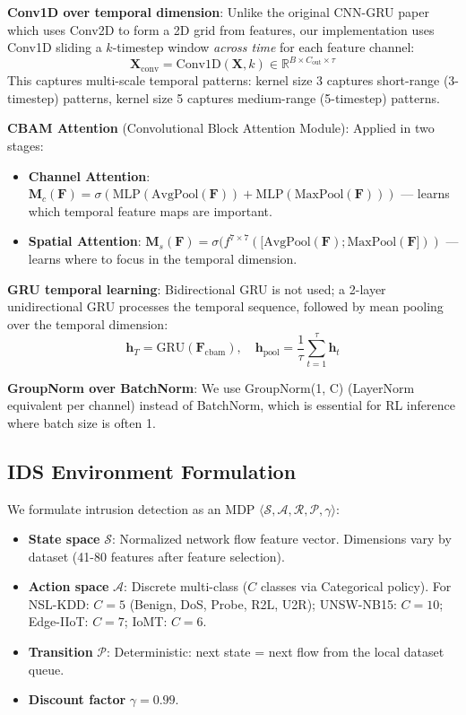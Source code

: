 \documentclass[conference]{IEEEtran}
\begin{document}
\textbf{Conv1D over temporal dimension}: Unlike the original CNN-GRU paper which uses Conv2D to form a 2D grid from features, our implementation uses Conv1D sliding a $k$-timestep window \emph{across time} for each feature channel:
\begin{equation}
\mathbf{X}_{\mathrm{conv}} = \mathrm{Conv1D}(\mathbf{X}, k) \in \mathbb{R}^{B \times C_{\mathrm{out}} \times \tau}
\end{equation}
This captures multi-scale temporal patterns: kernel size 3 captures short-range (3-timestep) patterns, kernel size 5 captures medium-range (5-timestep) patterns.

\textbf{CBAM Attention} (Convolutional Block Attention Module): Applied in two stages:
\begin{itemize}
    \item \textbf{Channel Attention}: $\mathbf{M}_c(\mathbf{F}) = \sigma(\mathrm{MLP}(\mathrm{AvgPool}(\mathbf{F})) + \mathrm{MLP}(\mathrm{MaxPool}(\mathbf{F})))$ --- learns which temporal feature maps are important.
    \item \textbf{Spatial Attention}: $\mathbf{M}_s(\mathbf{F}) = \sigma(f^{7\times7}([\mathrm{AvgPool}(\mathbf{F}); \mathrm{MaxPool}(\mathbf{F}]))$ --- learns where to focus in the temporal dimension.
\end{itemize}

\textbf{GRU temporal learning}: Bidirectional GRU is not used; a 2-layer unidirectional GRU processes the temporal sequence, followed by mean pooling over the temporal dimension:
\begin{equation}
\mathbf{h}_T = \mathrm{GRU}(\mathbf{F}_{\mathrm{cbam}}), \quad \mathbf{h}_{\mathrm{pool}} = \frac{1}{\tau}\sum_{t=1}^{\tau} \mathbf{h}_t
\end{equation}

\textbf{GroupNorm over BatchNorm}: We use GroupNorm(1, C) (LayerNorm equivalent per channel) instead of BatchNorm, which is essential for RL inference where batch size is often 1.

\subsection{IDS Environment Formulation}

We formulate intrusion detection as an MDP $\langle \mathcal{S}, \mathcal{A}, \mathcal{R}, \mathcal{P}, \gamma \rangle$:

\begin{itemize}
    \item \textbf{State space} $\mathcal{S}$: Normalized network flow feature vector. Dimensions vary by dataset (41-80 features after feature selection).
    \item \textbf{Action space} $\mathcal{A}$: Discrete multi-class ($C$ classes via Categorical policy). For NSL-KDD: $C=5$ (Benign, DoS, Probe, R2L, U2R); UNSW-NB15: $C=10$; Edge-IIoT: $C=7$; IoMT: $C=6$.
    \item \textbf{Transition} $\mathcal{P}$: Deterministic: next state = next flow from the local dataset queue.
    \item \textbf{Discount factor} $\gamma = 0.99$.
\end{itemize}
\end{document}

